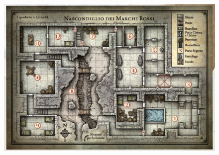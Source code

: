 \documentclass{article}
\begin{document}
 \begin{figure}[ht]
        \includegraphics[width=20cm,height=12cm]{../Mappe/NascondiglioDeiMarchiRossi.PNG}
    \end{figure}
\end{document}
